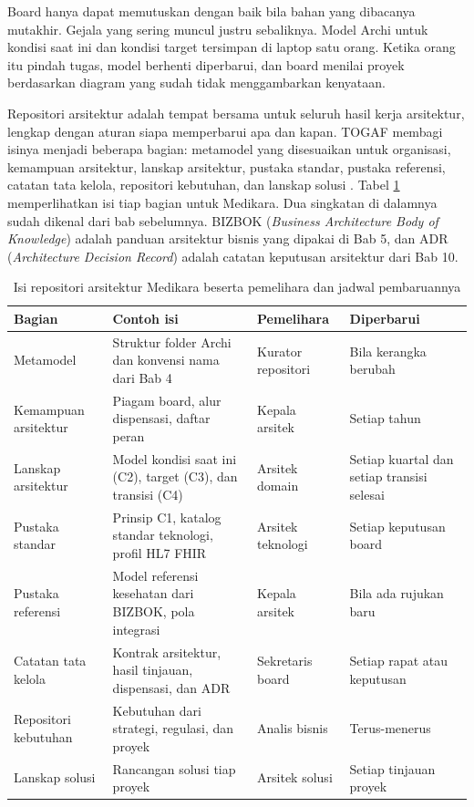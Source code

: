 Board hanya dapat memutuskan dengan baik bila bahan yang dibacanya
mutakhir. Gejala yang sering muncul justru sebaliknya. Model Archi untuk
kondisi saat ini dan kondisi target tersimpan di laptop satu orang. Ketika
orang itu pindah tugas, model berhenti diperbarui, dan board menilai proyek
berdasarkan diagram yang sudah tidak menggambarkan kenyataan.

Repositori arsitektur adalah tempat bersama untuk seluruh hasil kerja
arsitektur, lengkap dengan aturan siapa memperbarui apa dan kapan. TOGAF
membagi isinya menjadi beberapa bagian: metamodel yang disesuaikan untuk
organisasi, kemampuan arsitektur, lanskap arsitektur, pustaka standar,
pustaka referensi, catatan tata kelola, repositori kebutuhan, dan lanskap
solusi \cite{togaf10}. Tabel \ref{tab:ch14-repositori} memperlihatkan isi
tiap bagian untuk Medikara. Dua singkatan di dalamnya sudah dikenal dari
bab sebelumnya. BIZBOK (\textit{Business Architecture Body of Knowledge})
adalah panduan arsitektur bisnis yang dipakai di Bab 5, dan ADR
(\textit{Architecture Decision Record}) adalah catatan keputusan arsitektur
dari Bab 10.

\begin{table}[!htb]
  \centering
  \caption{Isi repositori arsitektur Medikara beserta pemelihara dan jadwal
           pembaruannya}
  \label{tab:ch14-repositori}
  \begin{tabularx}{\textwidth}{>{\raggedright\arraybackslash}p{2.3cm}>{\raggedright\arraybackslash}X>{\raggedright\arraybackslash}p{2.0cm}>{\raggedright\arraybackslash}p{2.2cm}}
    \hline
    \textbf{Bagian} & \textbf{Contoh isi} & \textbf{Pemelihara} & \textbf{Diperbarui} \\
    \hline
    Metamodel & Struktur folder Archi dan konvensi nama dari Bab 4 &
      Kurator repositori & Bila kerangka berubah \\
    \hline
    Kemampuan arsitektur & Piagam board, alur dispensasi, daftar peran &
      Kepala arsitek & Setiap tahun \\
    \hline
    Lanskap arsitektur & Model kondisi saat ini (C2), target (C3), dan
      transisi (C4) & Arsitek domain & Setiap kuartal dan setiap transisi
      selesai \\
    \hline
    Pustaka standar & Prinsip C1, katalog standar teknologi, profil HL7 FHIR
      & Arsitek teknologi & Setiap keputusan board \\
    \hline
    Pustaka referensi & Model referensi kesehatan dari BIZBOK, pola
      integrasi & Kepala arsitek & Bila ada rujukan baru \\
    \hline
    Catatan tata kelola & Kontrak arsitektur, hasil tinjauan, dispensasi,
      dan ADR & Sekretaris board & Setiap rapat atau keputusan \\
    \hline
    Repositori kebutuhan & Kebutuhan dari strategi, regulasi, dan proyek &
      Analis bisnis & Terus-menerus \\
    \hline
    Lanskap solusi & Rancangan solusi tiap proyek & Arsitek solusi & Setiap
      tinjauan proyek \\
    \hline
  \end{tabularx}
\end{table}

